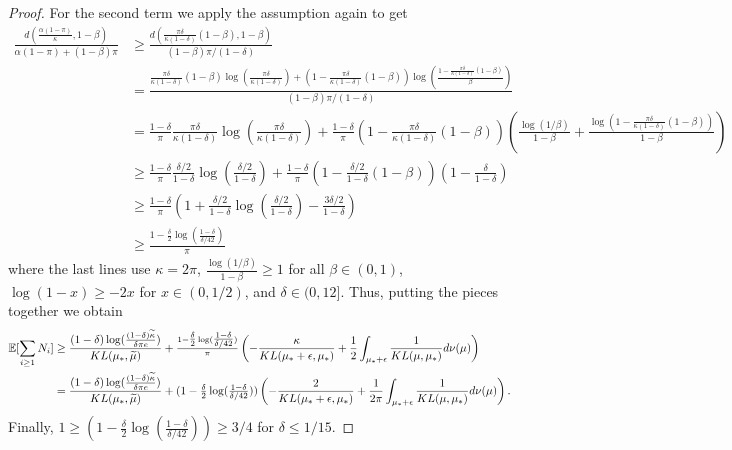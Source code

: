 \begin{proof}
For the second term we apply the assumption again to get
\begin{align*}
\frac{d\left(\tfrac{\alpha(1-\pi)}{\kappa} , 1-\beta \right)}{\alpha (1-\pi) + (1-\beta) \pi} &\geq \frac{d\left(\tfrac{\pi \delta}{\kappa (1-\delta)} (1-\beta) , 1-\beta \right)}{(1-\beta) \pi/(1-\delta)} \\
&= \frac{ \tfrac{\pi \delta}{\kappa (1-\delta)} (1-\beta) \log(\tfrac{\pi \delta}{\kappa (1-\delta)}) + \left(1- \tfrac{\pi \delta}{\kappa (1-\delta)} (1-\beta)\right) \log( \frac{1- \tfrac{\pi \delta}{\kappa (1-\delta)} (1-\beta)}{\beta})}{(1-\beta) \pi/(1-\delta)} \\
&= \tfrac{1-\delta}{\pi} \tfrac{\pi \delta}{\kappa (1-\delta)}  \log(\tfrac{\pi \delta}{\kappa (1-\delta)}) + \tfrac{1-\delta}{\pi}\left(1- \tfrac{\pi \delta}{\kappa (1-\delta)} (1-\beta)\right)\left( \tfrac{\log(1/\beta)}{1-\beta} + \tfrac{\log\left( 1- \tfrac{\pi \delta}{\kappa (1-\delta)} (1-\beta) \right)}{1-\beta} \right)\\
&\geq \tfrac{1-\delta}{\pi} \tfrac{\delta/2}{1-\delta}  \log(\tfrac{\delta/2}{1-\delta}) + \tfrac{1-\delta}{\pi}\left(1- \tfrac{\delta /2}{ 1-\delta} (1-\beta)\right)\left( 1- \tfrac{\delta}{1-\delta}   \right) \\
&\geq \tfrac{1-\delta}{\pi}( 1 + \tfrac{\delta/2}{1-\delta}  \log(\tfrac{\delta/2}{1-\delta}) - \tfrac{3\delta/2}{1-\delta} ) \\
&\geq \tfrac{1 - \tfrac{\delta}{2}  \log(\tfrac{1-\delta}{\delta/42})}{\pi} 
\end{align*}
where the last lines use $\kappa = 2\pi$, $\tfrac{\log(1/\beta)}{1-\beta} \geq 1$ for all $\beta \in (0,1)$, $\log(1-x) \geq -2x$ for $x \in (0,1/2)$, and $\delta \in (0, 12]$.
Thus, putting the pieces together we obtain
\begin{align*}
\mathbb{E}[ \sum_{i \geq 1} N_i ] &\geq \frac{(1-\delta) \log(\tfrac{(1-\delta)\widetilde{\kappa}}{\delta \pi e})}{KL(\mu_* , \widetilde{\mu})} + \tfrac{1 - \tfrac{\delta}{2}  \log(\tfrac{1-\delta}{\delta/42})}{\pi} \left(  - \frac{ \kappa}{KL(\mu_* + \epsilon, \mu_*)}  + \frac{1}{2} \int_{\mu_*+\epsilon} \frac{1}{KL(\mu,\mu_*)} d\nu(\mu) \right) \\
&= \frac{ (1-\delta) \log(\tfrac{(1-\delta)\widetilde{\kappa}}{\delta \pi e})}{KL(\mu_* , \widetilde{\mu})}  + (1 - \tfrac{\delta}{2}  \log(\tfrac{1-\delta}{\delta/42})) \left(  - \frac{2}{KL(\mu_* + \epsilon, \mu_*)}  + \frac{1}{2\pi} \int_{\mu_*+\epsilon} \frac{1}{KL(\mu,\mu_*)} d\nu(\mu) \right).
\end{align*}
Finally, $1 \geq (1 - \tfrac{\delta}{2}  \log(\tfrac{1-\delta}{\delta/42}))\geq 3/4$ for $\delta \leq 1/15$.

\end{proof}

